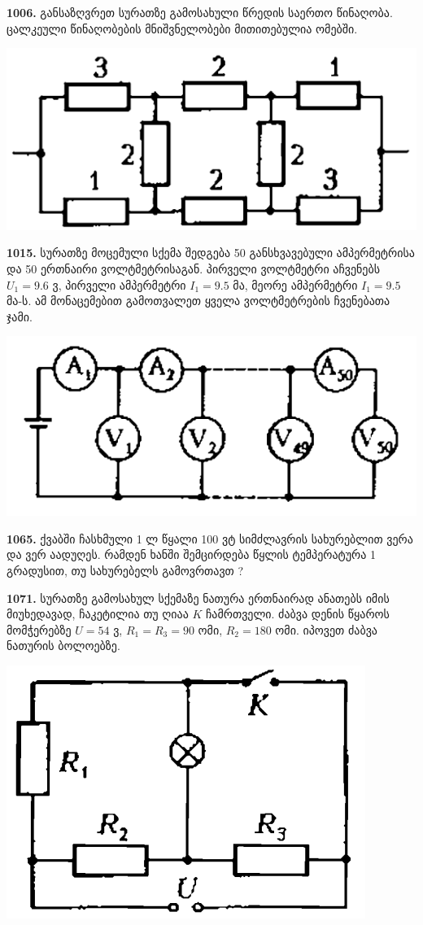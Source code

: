 \documentclass[12pt,a4paper,]{report}
\begin{document}
\textbf{1006.} განსაზღვრეთ სურათზე გამოსახული წრედის საერთო წინაღობა. ცალკეული წინაღობების მნიშვნელობები მითითებულია ომებში. 
		\begin{center}
			\includegraphics[scale=0.4]{images/1006.png}
		\end{center}

\textbf{1015.} სურათზე მოცემული სქემა შედგება 50 განსხვავებული ამპერმეტრისა და 50 ერთნაირი ვოლტმეტრისაგან. პირველი ვოლტმეტრი აჩვენებს $U_1=9.6$ ვ, პირველი ამპერმეტრი $I_1=9.5$ მა, მეორე ამპერმეტრი $I_1=9.5$ მა-ს. ამ მონაცემებით გამოთვალეთ ყველა ვოლტმეტრების ჩვენებათა ჯამი. 
		\begin{center}
			\includegraphics[scale=0.4]{images/1015.png}
		\end{center}

\textbf{1065.} ქვაბში ჩასხმული 1 ლ წყალი 100 ვტ სიმძლავრის სახურებლით ვერა და ვერ აადუღეს. რამდენ ხანში შემცირდება წყლის ტემპერატურა 1 გრადუსით, თუ სახურებელს გამოვრთავთ ?

\textbf{1071.} სურათზე გამოსახულ სქემაზე ნათურა ერთნაირად ანათებს იმის მიუხედავად, ჩაკეტილია თუ ღიაა $K$ ჩამრთველი. ძაბვა დენის წყაროს მომჭერებზე $U=54$ ვ, $R_1=R_3=90$ ომი, $R_2=180$ ომი. იპოვეთ ძაბვა ნათურის ბოლოებზე.
		\begin{center}
			\includegraphics[scale=0.3]{images/F1071.png}
		\end{center}
	
\end{document}
